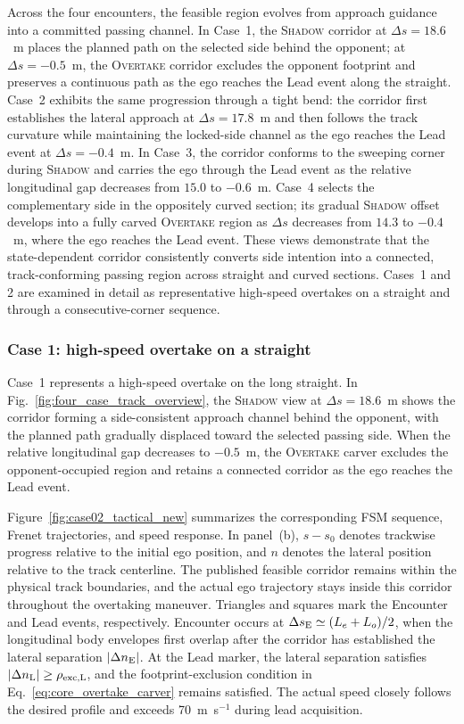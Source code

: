 \documentclass[journal,twoside,web]{ieeecolor}
\begin{document}
Across the four encounters, the feasible region evolves from approach guidance into a
committed passing channel. In Case~1, the \textsc{Shadow} corridor at
$\Delta s=18.6$~m places the planned path on the selected side behind the
opponent; at $\Delta s=-0.5$~m, the \textsc{Overtake} corridor excludes the
opponent footprint and preserves a continuous path as the ego reaches the Lead
event along the straight. Case~2
exhibits the same progression through a tight bend: the corridor first
establishes the lateral approach at $\Delta s=17.8$~m and then follows the
track curvature while maintaining the locked-side channel as the ego reaches
the Lead event at $\Delta s=-0.4$~m. In Case~3, the corridor conforms to the sweeping corner
during \textsc{Shadow} and carries the ego through the Lead event as the
relative longitudinal gap decreases from $15.0$ to $-0.6$~m. Case~4 selects the
complementary side in the oppositely curved section; its gradual
\textsc{Shadow} offset develops into a fully carved \textsc{Overtake} region
as $\Delta s$ decreases from $14.3$ to $-0.4$~m, where the ego reaches the
Lead event. These views demonstrate that
the state-dependent corridor consistently converts side intention into a
connected, track-conforming passing region across straight and curved
sections. Cases~1 and 2 are examined in detail as representative high-speed
overtakes on a straight and through a consecutive-corner sequence.

\subsubsection*{Case 1: high-speed overtake on a straight}

Case~1 represents a high-speed overtake on the long straight. In
Fig.~\ref{fig:four_case_track_overview}, the \textsc{Shadow} view at
$\Delta s=18.6$~m shows the corridor forming a side-consistent approach
channel behind the opponent, with the planned path gradually displaced toward
the selected passing side. When the relative longitudinal gap decreases to
$-0.5$~m, the \textsc{Overtake} carver excludes the opponent-occupied region
and retains a connected corridor as the ego reaches the Lead event.


Figure~\ref{fig:case02_tactical_new} summarizes the corresponding FSM sequence,
Frenet trajectories, and speed response. In panel~(b), $s-s_0$ denotes
trackwise progress relative to the initial ego position, and $n$ denotes the
lateral position relative to the track centerline. The published feasible
corridor remains within the physical track boundaries, and the actual ego
trajectory stays inside this corridor throughout the overtaking maneuver.
Triangles and squares mark the Encounter and Lead events, respectively.
Encounter occurs at $\Delta s_{\rm E}\simeq(L_e+L_o)/2$, when the longitudinal
body envelopes first overlap after the corridor has established the lateral
separation $|\Delta n_{\rm E}|$. At the Lead marker, the lateral separation
satisfies $|\Delta n_{\rm L}|\geq\rho_{{\rm exc},{\rm L}}$, and the
footprint-exclusion condition in Eq.~\eqref{eq:core_overtake_carver} remains
satisfied. The actual speed closely follows the desired profile
and exceeds 70~m~s$^{-1}$ during lead acquisition.
\end{document}
